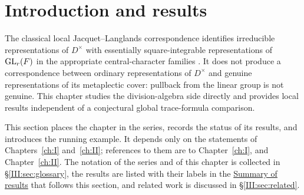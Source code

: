 \section{Introduction and results}
The classical local Jacquet--Langlands correspondence identifies
irreducible representations of $D^\times$ with essentially
square-integrable representations of $\operatorname{GL}_r(F)$ in the appropriate
central-character families \cite{DKV84}. It does not produce a
correspondence between ordinary representations of $D^\times$ and
genuine representations of its metaplectic cover: pullback from the
linear group is not genuine. This chapter studies the division-algebra
side directly and provides local results independent of a conjectural
global trace-formula comparison.

This section places the chapter in the series, records the status of its results, and introduces the running example. It depends only on the statements of Chapters~\ref{ch:I} and~\ref{ch:II}; references to them are to Chapter~\ref{ch:I}, and Chapter~\ref{ch:II}. The notation of the series and of this chapter is collected in \S\ref{III:sec:glossary}, the results are listed with their labels in the \hyperref[III:sec:summary]{Summary of results} that follows this section, and related work is discussed in \S\ref{III:sec:related}.

